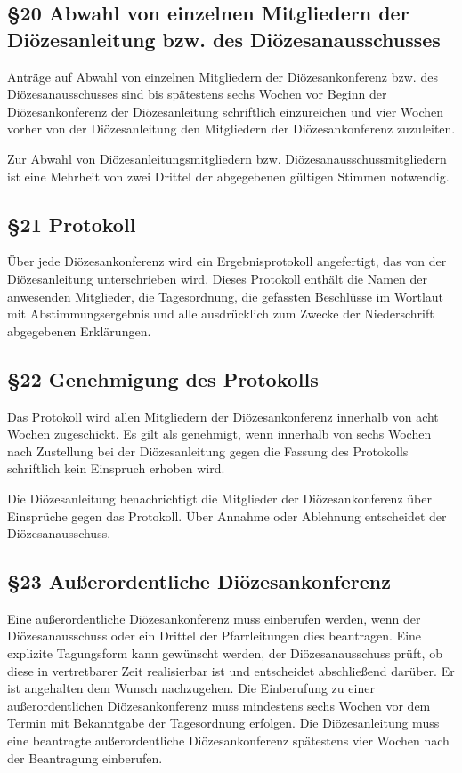 \documentclass[12pt]{report}
\begin{document}
\begin{justify}
\subsection*{§20 Abwahl von einzelnen Mitgliedern der Diözesanleitung bzw. des Diözesanausschusses}
Anträge auf Abwahl von einzelnen Mitgliedern der Diözesankonferenz bzw. des Diözesanausschusses sind
bis spätestens sechs Wochen vor Beginn der Diözesankonferenz der Diözesanleitung schriftlich einzureichen
und vier Wochen vorher von der Diözesanleitung den Mitgliedern der Diözesankonferenz zuzuleiten.

Zur Abwahl von Diözesanleitungsmitgliedern bzw. Diözesanausschussmitgliedern ist eine Mehrheit von zwei
Drittel der abgegebenen gültigen Stimmen notwendig.

\subsection*{§21 Protokoll}
Über jede Diözesankonferenz wird ein Ergebnisprotokoll angefertigt, das von der Diözesanleitung 
unterschrieben wird. Dieses Protokoll enthält die Namen der anwesenden Mitglieder, die Tagesordnung,
die gefassten Beschlüsse im Wortlaut mit Abstimmungsergebnis und alle ausdrücklich zum Zwecke der 
Niederschrift abgegebenen Erklärungen.
\subsection*{§22 Genehmigung des Protokolls}
Das Protokoll wird allen Mitgliedern der Diözesankonferenz innerhalb von acht Wochen zugeschickt. Es gilt
als genehmigt, wenn innerhalb von sechs Wochen nach Zustellung bei der Diözesanleitung gegen die Fassung
des Protokolls schriftlich kein Einspruch erhoben wird.

Die Diözesanleitung benachrichtigt die Mitglieder der Diözesankonferenz über Einsprüche gegen das Protokoll.
Über Annahme oder Ablehnung entscheidet der Diözesanausschuss.
\subsection*{§23 Außerordentliche Diözesankonferenz}
Eine außerordentliche Diözesankonferenz muss einberufen werden, wenn der
Diözesanausschuss oder ein Drittel der Pfarrleitungen dies beantragen. Eine explizite Tagungsform kann gewünscht werden, der Diözesanausschuss prüft, ob diese in vertretbarer Zeit realisierbar ist und entscheidet abschließend darüber. Er ist angehalten dem Wunsch nachzugehen. Die Einberufung zu einer außerordentlichen Diözesankonferenz muss mindestens sechs Wochen vor dem Termin mit Bekanntgabe der Tagesordnung erfolgen. Die Diözesanleitung muss eine beantragte außerordentliche Diözesankonferenz spätestens vier Wochen nach der Beantragung einberufen.

\end{justify}
\end{document}
